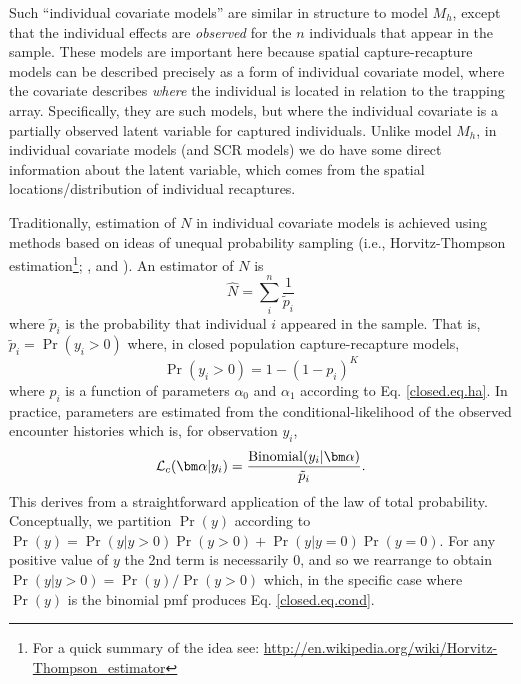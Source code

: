 Such ``individual covariate models'' are similar in structure to model
$M_{h}$, except that the individual effects are {\it observed} for the
$n$ individuals that appear in the sample. These models are important
here because spatial capture-recapture models can be described
precisely as a form of individual covariate model, where the covariate
describes {\it where} the individual is located in relation to the
trapping array. 
 Specifically, they are such models,
but where the individual covariate is a partially observed latent
variable for captured individuals. 
Unlike model $M_h$, in individual covariate models (and SCR models) we do have some
direct information about the latent variable, which comes from the
spatial locations/distribution of individual recaptures.

Traditionally, estimation of $N$ in individual covariate models is
achieved using methods based on ideas of unequal probability sampling
(i.e., Horvitz-Thompson estimation\footnote{For a  quick summary of
  the idea see:
  \url{http://en.wikipedia.org/wiki/Horvitz-Thompson_estimator}};
\citet{huggins:1989},
\citet{alho:1990} and \citet{borchers_etal:2002}). An estimator of $N$ is
\[
\hat{N} = \sum_{i}^{n} \frac{1}{\tilde{p}_{i}}
\]
where $\tilde{p}_{i}$ is the probability that individual $i$ appeared
in the sample.  That is, $\tilde{p}_{i} = \Pr(y_{i}>0)$
where, in closed population capture-recapture models,
\[
\Pr(y_{i}>0) = 1- (1-p_{i})^K
\]
where $p_{i}$ is a function of parameters $\alpha_{0}$ and $\alpha_{1}$
according to Eq. \ref{closed.eq.ha}.  In practice, parameters are
estimated from the conditional-likelihood of the observed encounter
histories which is, for observation $y_{i}$,
\begin{equation}
{\cal L}_{c}( {\bm \alpha} | y_{i}) = \frac{ \mbox{Binomial}(y_{i}|{\bm \alpha}) } { \tilde{p}_{i}}.
\label{closed.eq.cond}
\end{equation}
This derives from a straightforward application of the law of total
probability. Conceptually, we partition $\Pr(y)$ according to 
$\Pr(y) = \Pr(y|y>0)\Pr(y>0) + \Pr(y|y=0)\Pr(y=0)$. For any positive
value of $y$ the 2nd term is necessarily 0, and so we rearrange to
obtain
$\Pr(y|y>0) = \Pr(y)/\Pr(y>0)$ which, in the specific case where
$\Pr(y)$ is the 
binomial pmf produces Eq. \ref{closed.eq.cond}.


